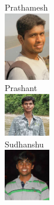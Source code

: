 \documentclass[12pt]{beamer}
\begin{document}
\begin{frame}[c]
\begin{columns}[c]
Prathamesh\\
\includegraphics[width=2cm]{./prath.jpg}\\
Prashant\\
\includegraphics[width=2cm]{./pr35.jpg}\\[12pt]
Sudhanshu\\
\includegraphics[width=2cm]{./sud.jpg}\\
\end{columns}
\end{frame}
\end{document}
